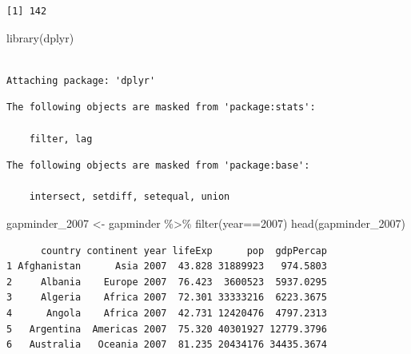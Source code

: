 \documentclass[
  letterpaper,
  DIV=11,
  numbers=noendperiod]{scrartcl}
\newenvironment{Shaded}{\begin{snugshade}}{\end{snugshade}}
\newcommand{\DecValTok}[1]{\textcolor[rgb]{0.68,0.00,0.00}{#1}}
\newcommand{\FunctionTok}[1]{\textcolor[rgb]{0.28,0.35,0.67}{#1}}
\newcommand{\NormalTok}[1]{\textcolor[rgb]{0.00,0.23,0.31}{#1}}
\newcommand{\OtherTok}[1]{\textcolor[rgb]{0.00,0.23,0.31}{#1}}
\newcommand{\SpecialCharTok}[1]{\textcolor[rgb]{0.37,0.37,0.37}{#1}}
\begin{document}
\begin{Shaded}
\end{Shaded}

\begin{verbatim}
[1] 142
\end{verbatim}

\begin{Shaded}
\begin{Highlighting}[]
\FunctionTok{library}\NormalTok{(dplyr)}
\end{Highlighting}
\end{Shaded}

\begin{verbatim}

Attaching package: 'dplyr'
\end{verbatim}

\begin{verbatim}
The following objects are masked from 'package:stats':

    filter, lag
\end{verbatim}

\begin{verbatim}
The following objects are masked from 'package:base':

    intersect, setdiff, setequal, union
\end{verbatim}

\begin{Shaded}
\begin{Highlighting}[]
\NormalTok{gapminder\_2007 }\OtherTok{\textless{}{-}}\NormalTok{ gapminder }\SpecialCharTok{\%\textgreater{}\%} \FunctionTok{filter}\NormalTok{(year}\SpecialCharTok{==}\DecValTok{2007}\NormalTok{)}
\FunctionTok{head}\NormalTok{(gapminder\_2007)}
\end{Highlighting}
\end{Shaded}

\begin{verbatim}
      country continent year lifeExp      pop  gdpPercap
1 Afghanistan      Asia 2007  43.828 31889923   974.5803
2     Albania    Europe 2007  76.423  3600523  5937.0295
3     Algeria    Africa 2007  72.301 33333216  6223.3675
4      Angola    Africa 2007  42.731 12420476  4797.2313
5   Argentina  Americas 2007  75.320 40301927 12779.3796
6   Australia   Oceania 2007  81.235 20434176 34435.3674
\end{verbatim}
\end{document}
